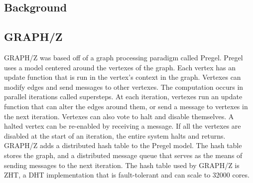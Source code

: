 \documentclass[10pt]{article}
\begin{document}
\begin{multicols}{2} 
  \section{Background}
  \subsection{GRAPH/Z}
  GRAPH/Z was based off of a graph processing paradigm called Pregel. Pregel uses a model centered around the vertexes of the graph.\cite{Gz:1}  Each vertex has an update function that is run in the vertex's context in the graph. Vertexes can modify edges and send messages to other vertexes.\cite{Gz:1} The computation occurs in parallel iterations called supersteps.\cite{Gz:1} At each iteration, vertexes run an update function that can alter the edges around them, or send a message to vertexes in the next iteration. Vertexes can also vote to halt and disable themselves. A halted vertex can be re-enabled by receiving a message. If all the vertexes are disabled at the start of an iteration, the entire system halts and returns.\\
  GRAPH/Z adds a distributed hash table to the Pregel model. The hash table stores the graph, and a distributed message queue that serves as the means of sending messages to the next iteration. The hash table used by GRAPH/Z is ZHT, a DHT implementation that is fault-tolerant and can scale to 32000 cores.\cite{Gz:2}


\end{multicols}
\end{document}
